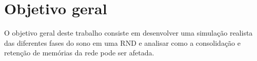 \section{Objetivo geral}

O objetivo geral deste trabalho consiste em desenvolver uma simulação realista das diferentes fases do sono em uma RND e analisar
como a consolidação e retenção de memórias da rede pode ser afetada.
